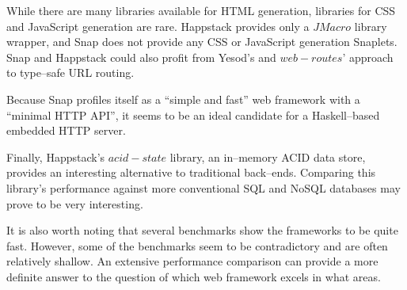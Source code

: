 While there are many libraries available for HTML generation, libraries for CSS and JavaScript generation are rare.
Happstack provides only a $ JMacro $ library wrapper, and Snap does not provide any CSS or JavaScript generation Snaplets.
Snap and Happstack could also profit from Yesod's and $ web-routes $' approach to type--safe URL routing.

Because Snap profiles itself as a ``simple and fast'' web framework with a ``minimal HTTP API'', it seems to be an ideal candidate for a Haskell--based embedded HTTP server.

Finally, Happstack's $ acid-state $ library, an in--memory ACID data store, provides an interesting alternative to traditional back--ends.
Comparing this library's performance against more conventional SQL and NoSQL databases may prove to be very interesting.

It is also worth noting that several benchmarks show the frameworks to be quite fast. \cite{snap,warp}
However, some of the benchmarks seem to be contradictory and are often relatively shallow.
An extensive performance comparison can provide a more definite answer to the question of which web framework excels in what areas.